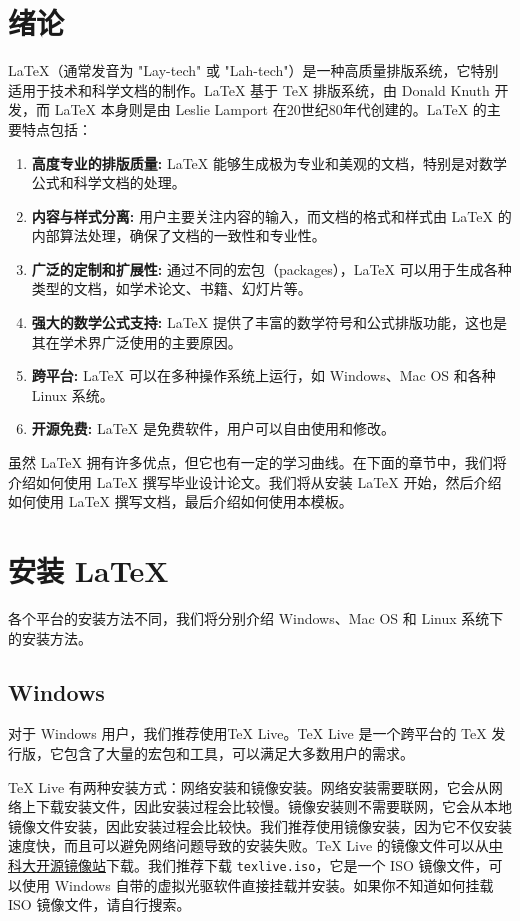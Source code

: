 \section{绪论}\label{sec:introduction}

LaTeX（通常发音为 "Lay-tech" 或 "Lah-tech"）是一种高质量排版系统，它特别适用于技术和科学文档的制作。LaTeX 基于 TeX 排版系统，由 Donald Knuth 开发，而 LaTeX 本身则是由 Leslie Lamport 在20世纪80年代创建的。LaTeX 的主要特点包括：

\begin{enumerate}
    \item \textbf{高度专业的排版质量:} LaTeX 能够生成极为专业和美观的文档，特别是对数学公式和科学文档的处理。
    \item \textbf{内容与样式分离:} 用户主要关注内容的输入，而文档的格式和样式由 LaTeX 的内部算法处理，确保了文档的一致性和专业性。
    \item \textbf{广泛的定制和扩展性:} 通过不同的宏包（packages），LaTeX 可以用于生成各种类型的文档，如学术论文、书籍、幻灯片等。
    \item \textbf{强大的数学公式支持:} LaTeX 提供了丰富的数学符号和公式排版功能，这也是其在学术界广泛使用的主要原因。
    \item \textbf{跨平台:} LaTeX 可以在多种操作系统上运行，如 Windows、Mac OS 和各种 Linux 系统。
    \item \textbf{开源免费:} LaTeX 是免费软件，用户可以自由使用和修改。
\end{enumerate}

虽然 LaTeX 拥有许多优点，但它也有一定的学习曲线。在下面的章节中，我们将介绍如何使用 LaTeX 撰写毕业设计论文。我们将从安装 LaTeX 开始，然后介绍如何使用 LaTeX 撰写文档，最后介绍如何使用本模板。

\section{安装 LaTeX}

各个平台的安装方法不同，我们将分别介绍 Windows、Mac OS 和 Linux 系统下的安装方法。

\subsection{Windows}

对于 Windows 用户，我们推荐使用TeX Live。TeX Live 是一个跨平台的 TeX 发行版，它包含了大量的宏包和工具，可以满足大多数用户的需求。

TeX Live 有两种安装方式：网络安装和镜像安装。网络安装需要联网，它会从网络上下载安装文件，因此安装过程会比较慢。镜像安装则不需要联网，它会从本地镜像文件安装，因此安装过程会比较快。我们推荐使用镜像安装，因为它不仅安装速度快，而且可以避免网络问题导致的安装失败。TeX Live 的镜像文件可以从\href{https://mirrors.ustc.edu.cn/CTAN/systems/texlive/Images/}{中科大开源镜像站}下载。我们推荐下载 \texttt{texlive.iso}，它是一个 ISO 镜像文件，可以使用 Windows 自带的虚拟光驱软件直接挂载并安装。如果你不知道如何挂载 ISO 镜像文件，请自行搜索。

